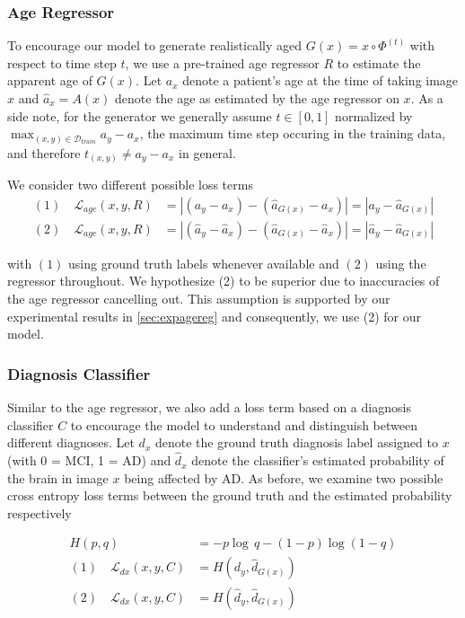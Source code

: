 \subsubsection*{Age Regressor} \label{sec:adaagereg}
To encourage our model to generate realistically aged $G(x) = x \circ \Phi^{(t)} $ with respect to time step $t$, we use a pre-trained age regressor $R$ to estimate the apparent age of $G(x)$.
Let $ a_x $ denote a patient's age at the time of taking image $x$ and $ \hat a_x = A(x)$ denote the age as estimated by the age regressor on $x$. As a side note, for the generator we generally assume $t \in [0, 1]$ normalized by $\max_{(x, y) \in \mathcal{D}_{train}} a_y - a_x $, the maximum time step occuring in the training data, and therefore $t_{(x, y)} \neq a_y - a_x$ in general.

We consider two different possible loss terms 
\begin{equation}
	\begin{split}
		(1) \quad \mathcal{L}_{age}(x, y, R) & = 
		| (a_y - a_x) - (\hat a_{G(x)} - a_x) | =
		| a_y - \hat a_{G(x)} | \\[8pt]
		(2) \quad \mathcal{L}_{age}(x, y, R) & =
		| (\hat a_y - \hat a_x) - (\hat a_{G(x)} - \hat a_x) | = 
		| \hat a_y - \hat a_{G(x)} |
	\end{split}
\end{equation}

with $(1)$ using ground truth labels whenever available and $(2)$ using the regressor throughout. We hypothesize (2) to be superior due to inaccuracies of the age regressor cancelling out. This assumption is supported by our experimental results in \autoref{sec:expagereg} and consequently, we use (2) for our model.

\subsubsection*{Diagnosis Classifier}
Similar to the age regressor, we also add a loss term based on a diagnosis classifier $C$ to encourage the model to understand and distinguish between different diagnoses. Let $d_x$ denote the ground truth diagnosis label assigned to $x$ (with 0 = MCI, 1 = AD) and $\hat d_x$ denote the classifier's estimated probability of the brain in image $x$ being affected by AD. As before, we examine two possible cross entropy loss terms between the ground truth and the estimated probability respectively

\begin{equation}
	\begin{split}
		H(p, q) & = -p \log\, q - (1 - p)\log(1 - q) \\[8pt]
		(1) \quad \mathcal{L}_{dx}(x, y, C) & = 
		H(d_y, \hat d_{G(x)}) \\[8pt]
		(2) \quad \mathcal{L}_{dx}(x, y, C) & =
		H(\hat d_y, \hat d_{G(x)}) \\[8pt]
	\end{split}
\end{equation}

